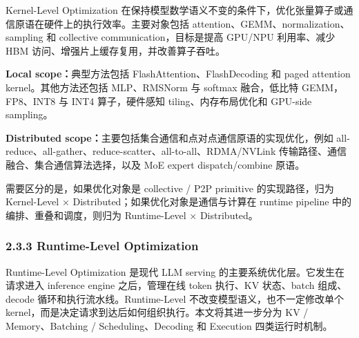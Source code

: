 Kernel-Level Optimization 在保持模型数学语义不变的条件下，优化张量算子或通信原语在硬件上的执行效率。主要对象包括 attention、GEMM、normalization、sampling 和 collective communication，目标是提高 GPU/NPU 利用率、减少 HBM 访问、增强片上缓存复用，并改善算子吞吐。

\textbf{Local scope：}典型方法包括 FlashAttention、FlashDecoding 和 paged attention kernel。其他方法还包括 MLP、RMSNorm 与 softmax 融合，低比特 GEMM，FP8、INT8 与 INT4 算子，硬件感知 tiling、内存布局优化和 GPU-side sampling。

\textbf{Distributed scope：}主要包括集合通信和点对点通信原语的实现优化，例如 all-reduce、all-gather、reduce-scatter、all-to-all、RDMA/NVLink 传输路径、通信融合、集合通信算法选择，以及 MoE expert dispatch/combine 原语。

需要区分的是，如果优化对象是 collective / P2P primitive 的实现路径，归为 Kernel-Level × Distributed；如果优化对象是通信与计算在 runtime pipeline 中的编排、重叠和调度，则归为 Runtime-Level × Distributed。




\subsubsection*{2.3.3 Runtime-Level Optimization}

Runtime-Level Optimization 是现代 LLM serving 的主要系统优化层。它发生在请求进入 inference engine 之后，管理在线 token 执行、KV 状态、batch 组成、decode 循环和执行流水线。Runtime-Level 不改变模型语义，也不一定修改单个 kernel，而是决定请求到达后如何组织执行。本文将其进一步分为 KV / Memory、Batching / Scheduling、Decoding 和 Execution 四类运行时机制。

